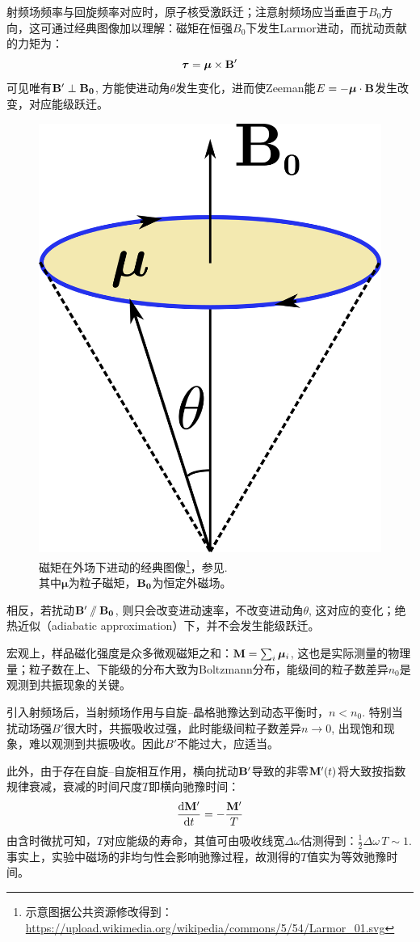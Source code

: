 \documentclass[aps,pre,12pt,preprint,%
	onecolumn,showpacs,showkeys,nofootinbib]{revtex4-1}
\begin{document}
	射频场频率与回旋频率对应时，原子核受激跃迁；注意射频场应当垂直于$B_0$方向，这可通过经典图像加以理解：磁矩在恒强$B_0$下发生Larmor进动，而扰动贡献的力矩为：
	\begin{equation}
		\bm{\tau} = \bm{\mu}\times\vb{B}'
	\end{equation}
	可见唯有$\vb{B}'\perp\vb{B_0}$, 方能使进动角$\theta$发生变化，进而使Zeeman能$E = -\bm{\mu}\cdot\vb{B}$发生改变，对应能级跃迁。
	
	\begin{figure}[!ht]
	\centering
	\includegraphics[width=.2\linewidth]{img/Larmor.png}
	\caption[Larmor进动图像]{%
		磁矩在外场下进动的经典图像\footnote{%
			示意图据公共资源修改得到：
			\url{https://upload.wikimedia.org/wikipedia/commons/5/54/Larmor_01.svg}
		}，参见\cite{textbook}. \\其中$\bm{\mu}$为粒子磁矩，$\vb{B_0}$为恒定外磁场。
	}\vspace{1ex}
	\end{figure}
\clearpage
	
	相反，若扰动$\vb{B}'\sslash\vb{B_0}$, 则只会改变进动速率，不改变进动角$\theta$, 这对应的变化；绝热近似（adiabatic approximation）下，并不会发生能级跃迁。
\restorejot
	
\newparagraph
	宏观上，样品磁化强度是众多微观磁矩之和：$\vb{M} = \sum_i \bm{\mu}_i$, 这也是实际测量的物理量；粒子数在上、下能级的分布大致为Boltzmann分布，能级间的粒子数差异$n_0$是观测到共振现象的关键。
	
	引入射频场后，当射频场作用与自旋--晶格驰豫达到动态平衡时，$n < n_0$. 特别当扰动场强$B'$很大时，共振吸收过强，此时能级间粒子数差异$n\to 0$, 出现饱和现象，难以观测到共振吸收。因此$B'$不能过大，应适当。
	
	此外，由于存在自旋--自旋相互作用，横向扰动$\vb{B}'$导致的非零$\vb{M}'(t)$将大致按指数规律衰减，衰减的时间尺度$T$即横向驰豫时间：
	\begin{equation}
		\dv{\vb{M}'}{t} = - \frac{\vb{M}'}{T}
	\end{equation}
	由含时微扰可知，$T$对应能级的寿命，其值可由吸收线宽$\Delta\omega$估测得到：$\frac{1}{2}\Delta\omega\,T\sim 1$. 事实上，实验中磁场的非均匀性会影响驰豫过程，故测得的$T$值实为等效驰豫时间。
	
\end{document}
